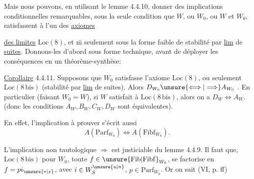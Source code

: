 Mais nous pouvons, en utilisant le lemme 4.4.10, donner des implications conditionnelles remarquables, sous la seule condition que $W$, ou $W_0$, ou $W$ et $W_0$, satisfassent à l'un des \uline{axiomes}

\uline{des limites} $\mathrm{Loc}(8)$, et \={m} seulement sous la forme faible de stabilité   par \uline{lim} de \uline{suites}. Donnons-les d'abord sous forme technique, avant de déployer les conséquences en un théorème-synthèse:

\uline{Corollaire} 4.4.11. Supposons que $W_0$ satisfasse  l'axiome $\mathrm{Loc}(8)$, ou seulement $\mathrm{Loc}(8\,\mathrm{bis})$ (stabilité par \uline{lim} de suites). Alors $D_{W_0}\unsure{\Longleftrightarrow|\Longrightarrow}A_{W_0}$ . En particulier (faisant $W_0=W$), si $W$ satisfait à $\mathrm{Loc}(8\,\mathrm{bis})$, alors on a $D_W\Longleftrightarrow A_W$. (donc les conditions $A_W,B_W,C_W,D_W$ sont équivalentes).

En effet, l'implication à prouver s'écrit aussi
\[
 A(\mathrm{Parf}_{W_0})\Longleftrightarrow A(\mathrm{Fibf}_{W_0}).
\]

L'implication  non tautologique $\Longrightarrow$ est justiciable du lemme 4.4.9. Il faut   que,  $\mathrm{Loc}(8\,\mathrm{bis})$ pour $W_0$, toute $f\in\unsure{\mathrm{Fib}|\mathrm{Fibf}}_{W_0}$,  se factorise en $f=pi_{\unsure{*|x}}$, avec $i\in W_S^{\unsure{u|n}}$, $p\in\mathrm{Parf}_{W_0}$. Or on sait (VI, p.  ff)

